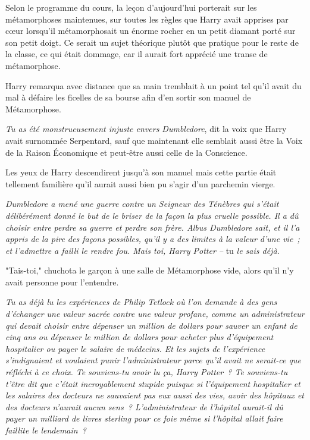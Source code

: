 Selon le programme du cours, la leçon d'aujourd'hui porterait sur les métamorphoses maintenues, sur toutes les règles que Harry avait apprises par cœur lorsqu'il métamorphosait un énorme rocher en un petit diamant porté sur son petit doigt. Ce serait un sujet théorique plutôt que pratique pour le reste de la classe, ce qui était dommage, car il aurait fort apprécié une transe de métamorphose.

Harry remarqua avec distance que sa main tremblait à un point tel qu'il avait du mal à défaire les ficelles de sa bourse afin d'en sortir son manuel de Métamorphose.

\emph{Tu as été monstrueusement injuste envers Dumbledore}, dit la voix que Harry avait surnommée Serpentard, sauf que maintenant elle semblait aussi être la Voix de la Raison Économique et peut-être aussi celle de la Conscience.

Les yeux de Harry descendirent jusqu'à son manuel mais cette partie était tellement familière qu'il aurait aussi bien pu s'agir d'un parchemin vierge.

\emph{Dumbledore a mené une guerre contre un Seigneur des Ténèbres qui s'était délibérément donné le but de le briser de la façon la plus cruelle possible. Il a dû choisir entre perdre sa guerre et perdre son frère. Albus Dumbledore sait, et il l'a appris de la pire des façons possibles, qu'il y a des limites à la valeur d'une vie~; et l'admettre a failli le rendre fou. Mais toi, Harry Potter --} tu \emph{le sais déjà.}

"Tais-toi," chuchota le garçon à une salle de Métamorphose vide, alors qu'il n'y avait personne pour l'entendre.

\emph{Tu as déjà lu les expériences de Philip Tetlock où l'on demande à des gens d'échanger une valeur sacrée contre une valeur profane, comme un administrateur qui devait choisir entre dépenser un million de dollars pour sauver un enfant de cinq ans ou dépenser le million de dollars pour acheter plus d'équipement hospitalier ou payer le salaire de médecins. Et les sujets de l'expérience s'indignaient et voulaient punir l'administrateur parce qu'il avait ne serait-ce que réfléchi à ce choix. Te souviens-tu avoir lu ça, Harry Potter~? Te souviens-tu t'être dit que c'était incroyablement stupide puisque si l'équipement hospitalier et les salaires des docteurs ne sauvaient pas eux aussi des vies, avoir des hôpitaux et des docteurs n'aurait aucun sens~? L'administrateur de l'hôpital aurait-il dû payer un milliard de livres sterling pour ce foie même si l'hôpital allait faire faillite le lendemain~?}

